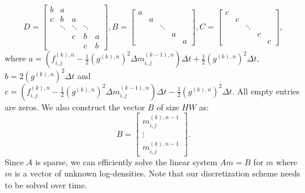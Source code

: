 \documentclass[]{interact}
\theoremstyle{plain}%
\theoremstyle{definition}
\theoremstyle{remark}
\begin{document}
\begin{equation}
    D = \begin{bmatrix}
        b & a &  &  & \\
        c & b & a &  &  \\
         & \ddots & \ddots & \ddots &  \\
         &  &c & b & a\\
         &  &  & c & b
    \end{bmatrix},
    B = \begin{bmatrix}
        a &  &  &  & \\
         & a &  &  &  \\
         &  & \ddots &  &  \\
         &  & & a & \\
         &  &  &  & a
    \end{bmatrix},
    C = \begin{bmatrix}
        c &  &  &  & \\
         & c &  &  &  \\
         &  & \ddots &  &  \\
         &  & & c & \\
         &  &  &  & c
    \end{bmatrix},
\end{equation}
where $a = (f^{(k),n}_{i,j} - \frac{1}{2}(g^{(k),n})^2\Delta m^{(k-1),n}_{i,j})\Delta t + \frac{1}{2}(g^{(k),n})^2 \Delta t$, $b = 2(g^{(k),n})^2\Delta t$ and $c = (f^{(k),n}_{i,j} - \frac{1}{2}(g^{(k),n})^2\Delta m^{(k-1),n}_{i,j})\Delta t - \frac{1}{2}(g^{(k),n})^2 \Delta t$. All empty entries are zeros. We also construct the vector $B$ of size $HW$ as:
\begin{equation}
    B = \begin{bmatrix}
        m^{(k),n-1}_{i,j}\\
        \vdots\\
        m^{(k),n-1}_{i,j}
    \end{bmatrix}.
\end{equation}
Since $A$ is sparse, we can efficiently solve the linear system $Am=B$ for $m$ where $m$ is a vector of unknown log-densities. Note that our discretization scheme needs to be solved over time.
\end{document}

